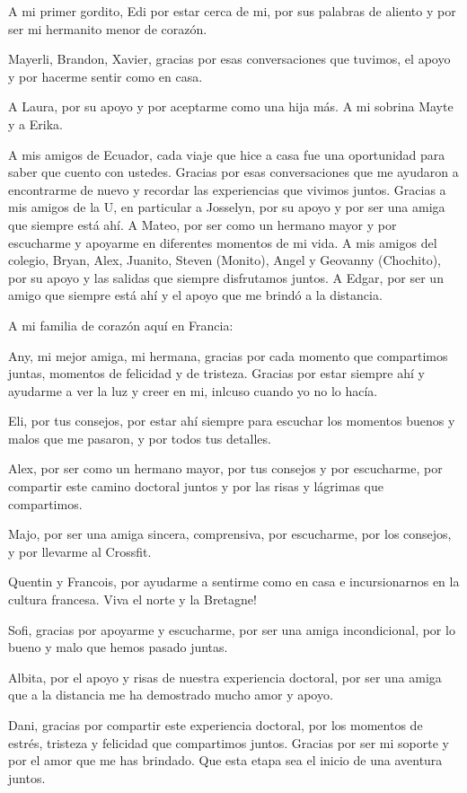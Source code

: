 A mi primer gordito, Edi por estar cerca de mi, por sus palabras
de aliento y por ser mi hermanito menor de corazón.


Mayerli, Brandon, Xavier, gracias por esas conversaciones que tuvimos,
el apoyo y por hacerme sentir como en casa.

A Laura, por su apoyo y por aceptarme como una hija más. 
A mi sobrina Mayte y a Erika.



A mis amigos de Ecuador, cada viaje que hice a casa fue una oportunidad
para saber que cuento con ustedes. Gracias por esas conversaciones
que me ayudaron a encontrarme de nuevo y recordar las experiencias
que vivimos juntos.
Gracias a  mis amigos de la U, en particular a Josselyn, por su apoyo
y por ser una amiga que siempre está ahí. A Mateo, por ser como un hermano mayor
y por escucharme y apoyarme en diferentes momentos de mi vida. 
A mis amigos del colegio, 
Bryan, Alex, Juanito, Steven (Monito), Angel y Geovanny (Chochito), 
por su apoyo y las salidas que siempre disfrutamos juntos.
A Edgar, por ser un amigo que siempre está ahí y el apoyo que me brindó
a la distancia.

A mi familia de corazón aquí en Francia: 

Any, mi mejor amiga, mi hermana, gracias por
cada momento que compartimos juntas, momentos de felicidad y de tristeza.
Gracias por estar siempre ahí y ayudarme a ver la luz y creer en mi, 
inlcuso cuando yo no lo hacía.

Eli, por tus consejos, por  estar ahí siempre para escuchar los momentos 
buenos y malos que me pasaron,  y por todos tus detalles.

Alex, por ser como un hermano mayor, por tus consejos y por escucharme, 
por compartir este camino doctoral juntos y por las risas y lágrimas que compartimos.

Majo, por ser una amiga sincera, comprensiva, por escucharme, por los consejos, y por llevarme al Crossfit.

Quentin y Francois, por ayudarme a sentirme como en casa e incursionarnos en la cultura francesa.
Viva el norte y la Bretagne!

Sofi, gracias por apoyarme y escucharme, por ser una amiga incondicional, por lo bueno 
y malo que hemos pasado juntas.

Albita,  por el apoyo y risas de nuestra experiencia doctoral, por ser una amiga
que a la distancia me ha demostrado mucho amor y apoyo.


Dani, gracias por compartir este experiencia doctoral, por los momentos de estrés, 
tristeza y felicidad que compartimos juntos. Gracias por ser mi soporte y por el amor 
que me has brindado. Que esta etapa sea el inicio de una aventura juntos.


